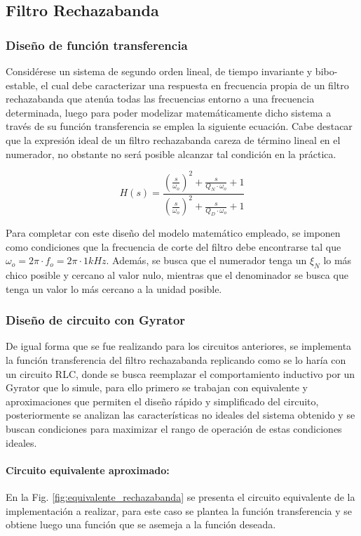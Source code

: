 \subsection{Filtro Rechazabanda}
\subsubsection{Dise\~no de funci\'on transferencia}
Consid\'erese un sistema de segundo orden lineal, de tiempo invariante y bibo-estable, el cual debe caracterizar una respuesta en frecuencia propia de un filtro rechazabanda que aten\'ua todas las frecuencias entorno a una frecuencia determinada,
luego para poder modelizar matem\'aticamente dicho sistema a trav\'es de su funci\'on transferencia se emplea la siguiente ecuaci\'on. Cabe destacar que la expresi\'on ideal de un filtro rechazabanda careza de t\'ermino lineal en el numerador, no obstante
no ser\'a posible alcanzar tal condici\'on en la pr\'actica.

\begin{equation}
    H(s) = \frac{\left( \frac{s}{\omega_o} \right)^{2} + \frac{s}{Q_N \cdot \omega_o} + 1}{\left( \frac{s}{\omega_o} \right)^{2} + \frac{s}{Q_D \cdot \omega_o} + 1}    
\end{equation}

Para completar con este dise\~no del modelo matem\'atico empleado, se imponen como condiciones que la frecuencia de corte del filtro debe encontrarse tal que $\omega_o = 2\pi \cdot f_o =  2\pi \cdot 1kHz$. Adem\'as,
se busca que el numerador tenga un $\xi_N$ lo m\'as chico posible y cercano al valor nulo, mientras que el denominador se busca que tenga un valor lo m\'as cercano a la unidad posible.

\subsubsection{Dise\~no de circuito con Gyrator}
De igual forma que se fue realizando para los circuitos anteriores, se implementa la funci\'on transferencia del filtro rechazabanda replicando como se lo har\'ia con un circuito RLC, donde se busca reemplazar el comportamiento inductivo
por un Gyrator que lo simule, para ello primero se trabajan con equivalente y aproximaciones que permiten el dise\~no r\'apido y simplificado del circuito, posteriormente se analizan las caracter\'isticas no ideales del sistema obtenido y se buscan 
condiciones para maximizar el rango de operaci\'on de estas condiciones ideales.

\paragraph*{Circuito equivalente aproximado:} En la Fig. \ref{fig:equivalente_rechazabanda} se presenta el circuito equivalente de la implementaci\'on a realizar, para este caso se plantea la funci\'on transferencia y se obtiene luego
una funci\'on que se asemeja a la funci\'on deseada. 

